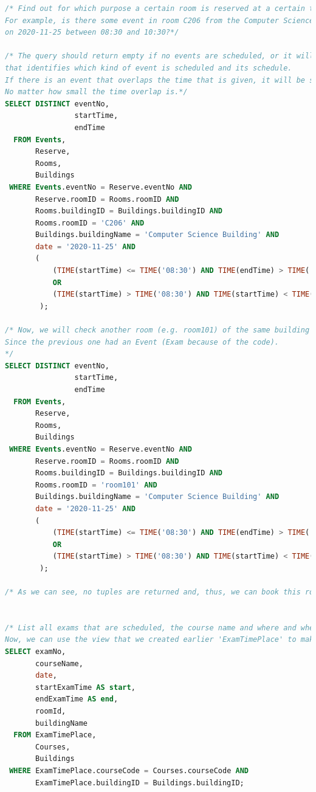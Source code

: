 \documentclass{article}
\begin{document}
\begin{lstlisting}[language=SQL]
/* Find out for which purpose a certain room is reserved at a certain time. 
For example, is there some event in room C206 from the Computer Science Building 
on 2020-11-25 between 08:30 and 10:30?*/

/* The query should return empty if no events are scheduled, or it will return the EventNo 
that identifies which kind of event is scheduled and its schedule.
If there is an event that overlaps the time that is given, it will be shown as well.
No matter how small the time overlap is.*/
SELECT DISTINCT eventNo,
                startTime,
                endTime
  FROM Events,
       Reserve,
       Rooms,
       Buildings
 WHERE Events.eventNo = Reserve.eventNo AND 
       Reserve.roomID = Rooms.roomID AND
       Rooms.buildingID = Buildings.buildingID AND 
       Rooms.roomID = 'C206' AND 
       Buildings.buildingName = 'Computer Science Building' AND 
       date = '2020-11-25' AND 
       (
           (TIME(startTime) <= TIME('08:30') AND TIME(endTime) > TIME('08:30') ) 
           OR 
           (TIME(startTime) > TIME('08:30') AND TIME(startTime) < TIME('10:30') )
        );

/* Now, we will check another room (e.g. room101) of the same building for the same time schedule.
Since the previous one had an Event (Exam because of the code).
*/
SELECT DISTINCT eventNo,
                startTime,
                endTime
  FROM Events,
       Reserve,
       Rooms,
       Buildings
 WHERE Events.eventNo = Reserve.eventNo AND 
       Reserve.roomID = Rooms.roomID AND
       Rooms.buildingID = Buildings.buildingID AND 
       Rooms.roomID = 'room101' AND 
       Buildings.buildingName = 'Computer Science Building' AND 
       date = '2020-11-25' AND 
       (
           (TIME(startTime) <= TIME('08:30') AND TIME(endTime) > TIME('08:30') ) 
           OR 
           (TIME(startTime) > TIME('08:30') AND TIME(startTime) < TIME('10:30') )
        );
        
/* As we can see, no tuples are returned and, thus, we can book this room for this time schedule freely.*/


/* List all exams that are scheduled, the course name and where and when it is scheduled to take place.
Now, we can use the view that we created earlier 'ExamTimePlace' to make the query much simpler.*/ 
SELECT examNo,
       courseName,
       date,
       startExamTime AS start,
       endExamTime AS end,
       roomId,
       buildingName
  FROM ExamTimePlace,
       Courses,
       Buildings
 WHERE ExamTimePlace.courseCode = Courses.courseCode AND 
       ExamTimePlace.buildingID = Buildings.buildingID;



\end{lstlisting}
\end{document}
